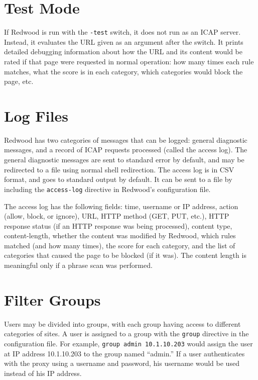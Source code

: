 \documentclass{article}
\begin{document}
\section{Test Mode}

If Redwood is run with the \verb"-test" switch, it does not run as an ICAP server. 
Instead, it evaluates the URL given as an argument after the switch.
It prints detailed debugging information about how the URL and its content would be rated
if that page were requested in normal operation: how many times each rule matches, 
what the score is in each category, which categories would block the page, etc.

\section{Log Files}

Redwood has two categories of messages that can be logged:
general diagnostic messages, and a record of ICAP requests processed (called the access log).
The general diagnostic messages are sent to standard error by default,
and may be redirected to a file using normal shell redirection.
The access log is in CSV format, 
and goes to standard output by default.
It can be sent to a file by including the \verb"access-log" directive in Redwood's configuration file.

The access log has the following fields: time, username or IP address, 
action (allow, block, or ignore), URL, HTTP method (GET, PUT, etc.),
HTTP response status (if an HTTP response was being processed), 
content type, content-length, whether the content was modified by Redwood, which rules matched (and how many times), 
the score for each category, and the list of categories that caused the page to be blocked (if it was).
The content length is meaningful only if a phrase scan was performed.

\section{Filter Groups}

Users may be divided into groups, with each group having access to different categories of sites.
A user is assigned to a group with the \verb"group" directive in the configuration file.
For example, \verb"group admin 10.1.10.203" would assign the user at IP address 10.1.10.203
to the group named ``admin.'' 
If a user authenticates with the proxy using a username and password, 
his username would be used instead of his IP address.
\end{document}
